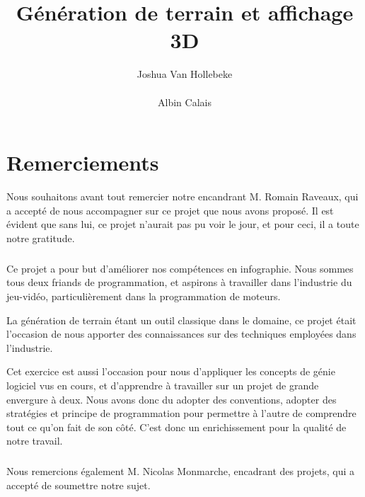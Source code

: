 \documentclass{EPUProjetDi}
\title{Génération de terrain et affichage 3D}
\author{
	Joshua Van Hollebeke\\
	\noindent[\url{joshua.van-hollebeke@etu.univ-tours.fr}]\\
	Albin Calais\\
	\noindent[\url{albin.calais@etu.univ-tours.fr}]
}
\begin{document}
\maketitle

\setcounter{page}{0}

{
\setlength{\parskip}{0em}
\tableofcontents
\listoffigures
}

\start



\chapter*{Remerciements} 

Nous souhaitons avant tout remercier notre encandrant M. Romain Raveaux, qui a accepté de nous accompagner sur ce projet que nous avons proposé.
Il est évident que sans lui, ce projet n'aurait pas pu voir le jour, et pour ceci, il a toute notre gratitude.

\paragraph{}

Ce projet a pour but d'améliorer nos compétences en infographie. Nous sommes tous deux friands de programmation, et aspirons à travailler dans l'industrie du jeu-vidéo, particulièrement dans la programmation de moteurs.

La génération de terrain étant un outil classique dans le domaine, ce projet était l'occasion de nous apporter des connaissances sur des techniques employées dans l'industrie. 

Cet exercice est aussi l'occasion pour nous d'appliquer les concepts de génie logiciel vus en cours, et d'apprendre à travailler sur un projet de grande envergure à deux.
Nous avons donc du adopter des conventions, adopter des stratégies et principe de programmation pour permettre à l'autre de comprendre tout ce qu'on fait de son côté. C'est donc un enrichissement pour la qualité de notre travail. 

\paragraph{}

Nous remercions également M. Nicolas Monmarche, encadrant des projets, qui a accepté de soumettre notre sujet.
\end{document}
